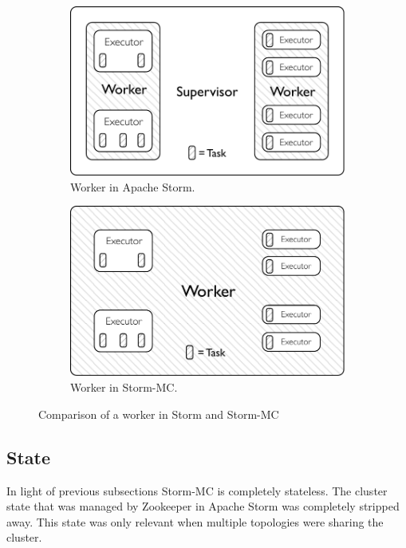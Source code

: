\begin{figure}[!htb]
\centering
\begin{subfigure}{.5\textwidth}
  \centering
  \includegraphics[width=0.95\linewidth]{pdf/distributed_worker.pdf}
  \caption{Worker in Apache Storm.}
  \label{fig:comparison1}
\end{subfigure}%
\begin{subfigure}{.5\textwidth}
  \centering
  \includegraphics[width=0.95\linewidth]{pdf/local_worker.pdf}
  \caption{Worker in Storm-MC.}
  \label{fig:comparison2}
\end{subfigure}
\caption{Comparison of a worker in Storm and Storm-MC}
\label{fig:comparison}
\end{figure}

\subsection{State}


In light of previous subsections Storm-MC is completely stateless. The cluster state that was managed by Zookeeper in Apache Storm was completely stripped away. This state was only relevant when multiple topologies were sharing the cluster.

